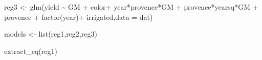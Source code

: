 \documentclass[
]{article}
\newenvironment{Shaded}{\begin{snugshade}}{\end{snugshade}}
\newcommand{\AttributeTok}[1]{\textcolor[rgb]{0.77,0.63,0.00}{#1}}
\newcommand{\FunctionTok}[1]{\textcolor[rgb]{0.00,0.00,0.00}{#1}}
\newcommand{\NormalTok}[1]{#1}
\newcommand{\OtherTok}[1]{\textcolor[rgb]{0.56,0.35,0.01}{#1}}
\newcommand{\SpecialCharTok}[1]{\textcolor[rgb]{0.00,0.00,0.00}{#1}}
\begin{document}
\begin{Shaded}
\begin{Highlighting}[]
\NormalTok{reg3 }\OtherTok{\textless{}{-}} \FunctionTok{glm}\NormalTok{(yield }\SpecialCharTok{\textasciitilde{}}\NormalTok{ GM }\SpecialCharTok{+}\NormalTok{ color}\SpecialCharTok{+}\NormalTok{ year}\SpecialCharTok{*}\NormalTok{provence}\SpecialCharTok{*}\NormalTok{GM }\SpecialCharTok{+}\NormalTok{ provence}\SpecialCharTok{*}\NormalTok{yearsq}\SpecialCharTok{*}\NormalTok{GM }\SpecialCharTok{+}\NormalTok{ provence }\SpecialCharTok{+} \FunctionTok{factor}\NormalTok{(year)}\SpecialCharTok{+}\NormalTok{ irrigated,}\AttributeTok{data =}\NormalTok{ dat)}


\NormalTok{models }\OtherTok{\textless{}{-}} \FunctionTok{list}\NormalTok{(reg1,reg2,reg3)}
\end{Highlighting}
\end{Shaded}

\begin{Shaded}
\begin{Highlighting}[]
\FunctionTok{extract\_eq}\NormalTok{(reg1)}
\end{Highlighting}
\end{Shaded}
\end{document}
